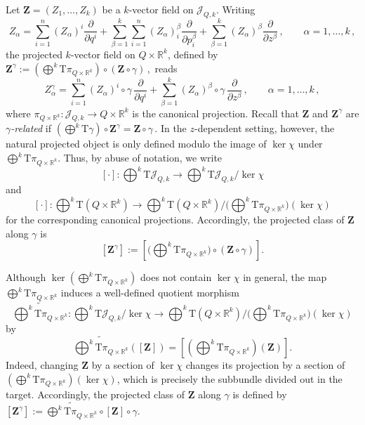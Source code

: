 \documentclass[11pt,twoside]{article}
\theoremstyle{plain}
\theoremstyle{definition}
\theoremstyle{remark}
\newcommand{\T}{\mathrm{T}}
\begin{document}
Let \(\mathbf Z=(Z_1,\dots,Z_k)\) be a $k$-vector field on \(\mathcal{J}_{Q,k}\). Writing
\[
Z_\alpha
=
\sum_{i=1}^n (Z_\alpha)^i\frac{\partial}{\partial q^i}
+\sum_{\beta=1}^k\sum_{i=1}^n (Z_\alpha)_i^\beta\frac{\partial}{\partial p_i^\beta}
+\sum_{\beta=1}^k (Z_\alpha)^\beta\frac{\partial}{\partial z^\beta}\,,\qquad \alpha=1,\dotsc,k\,,
\]
the projected $k$-vector field on \(Q\times\mathbb{R}^k\), defined by
\(
\textstyle\mathbf Z^\gamma:=\left(\bigoplus\nolimits^k \T\pi_{Q\times\mathbb{R}^k}\right)\circ (\mathbf Z\circ \gamma)\,,
\) 
reads
\[
Z^\gamma_\alpha
=
\sum_{i=1}^n (Z_\alpha)^i\circ\gamma\, \frac{\partial}{\partial q^i}
+\sum_{\beta=1}^k (Z_\alpha)^\beta\circ\gamma\, \frac{\partial}{\partial z^\beta}\,,\qquad \alpha=1,\dotsc,k\,,
\]
where \(\pi_{Q\times\mathbb{R}^k}\colon \mathcal{J}_{Q,k}\to Q\times\mathbb{R}^k\) is the canonical projection. Recall that \(\mathbf Z\) and \(\mathbf Z^\gamma\) are \emph{\(\gamma\)-related} if
\(\textstyle
\left(\bigoplus\nolimits^k \T\gamma\right)\circ \mathbf Z^\gamma=\mathbf Z\circ\gamma\,.
\) In the \(z\)-dependent setting, however, the natural projected object is only defined modulo the image of \(\ker\chi\) under \(\bigoplus^k\T\pi_{Q\times\mathbb{R}^k}\). Thus, by abuse of notation, we write
\[\textstyle
[\cdot]\colon \bigoplus\nolimits^k \T\mathcal{J}_{Q,k}\longrightarrow \bigoplus\nolimits^k \T\mathcal{J}_{Q,k}/\ker\chi
\]
and
\[
\textstyle[\cdot]\colon \bigoplus\nolimits^k \T(Q\times\mathbb{R}^k)\longrightarrow \bigoplus\nolimits^k \T(Q\times\mathbb{R}^k)\big/\big(\bigoplus\nolimits^k\T\pi_{Q\times\mathbb{R}^k}\big)(\ker\chi)
\]
for the corresponding canonical projections. Accordingly, the projected class of \(\mathbf Z\) along \(\gamma\) is
\[\textstyle
[\mathbf Z^\gamma]:=\left[\big(\bigoplus\nolimits^k \T\pi_{Q\times\mathbb{R}^k}\big)\circ (\mathbf Z\circ \gamma)\right].
\]


Although \(\ker(\bigoplus^k\T\pi_{Q\times\mathbb{R}^k})\) does not contain \(\ker\chi\) in general,  the map \(\bigoplus^k\T\pi_{Q\times\mathbb{R}^k}\) induces a well-defined quotient morphism
\[
\widetilde{\bigoplus^k\T\pi_{Q\times\mathbb{R}^k}}\colon
\bigoplus^k \T\mathcal{J}_{Q,k}/\ker\chi
\longrightarrow
\bigoplus^k \T(Q\times\mathbb{R}^k)\big/\big(\bigoplus^k\T\pi_{Q\times\mathbb{R}^k}\big)(\ker\chi)
\]
by
\[
\widetilde{\bigoplus^k\T\pi_{Q\times\mathbb{R}^k}}([\mathbf Z])
=
\left[
\left(\bigoplus^k\T\pi_{Q\times\mathbb{R}^k}\right)(\mathbf Z)
\right].
\]
Indeed, changing \(\mathbf Z\) by a section of \(\ker\chi\) changes its projection by a section of \((\bigoplus^k\T\pi_{Q\times\mathbb{R}^k})(\ker\chi)\), which is precisely the subbundle divided out in the target.
Accordingly, the projected class of \(\mathbf Z\) along \(\gamma\) is defined by \([\mathbf Z^\gamma]:=\widetilde{\bigoplus^k\T\pi_{Q\times\mathbb{R}^k}}\circ [\mathbf Z]\circ\gamma\).
\end{document}
